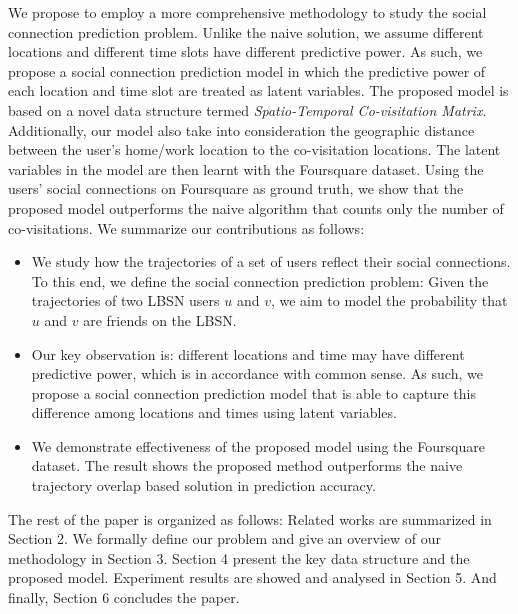 We propose to employ a more comprehensive methodology to study the social connection prediction problem. Unlike the naive solution, we assume different locations and different time slots have different predictive power. As such, we propose a social connection prediction model in which the predictive power of each location and time slot are treated as latent variables. The proposed model is based on a novel data structure termed \textit{Spatio-Temporal Co-visitation Matrix}. Additionally, our model also take into consideration the geographic distance between the user's home/work location to the co-visitation locations. The latent variables in the model are then learnt with the Foursquare dataset. Using the users' social connections on Foursquare as ground truth, we show that the proposed model outperforms the naive algorithm that counts only the number of co-visitations. We summarize our contributions as follows:
\begin{itemize}

\item We study how the trajectories of a set of users reflect their social connections. To this end, we define the social connection prediction problem: Given the trajectories of two LBSN users $u$ and $v$, we aim to model the probability that $u$ and $v$ are friends on the LBSN.

\item Our key observation is: different locations and time may have different predictive power, which is in accordance with common sense. As such, we propose a social connection prediction model that is able to capture this difference among locations and times using latent variables.

\item We demonstrate effectiveness of the proposed model using the Foursquare dataset. The result shows the proposed method outperforms the naive trajectory overlap based solution in prediction accuracy.

\end{itemize} 

The rest of the paper is organized as follows: Related works are summarized in Section 2. We formally define our problem and give an overview of our methodology in Section 3. Section 4 present the key data structure and the proposed model. Experiment results are showed and analysed in Section 5. And finally, Section 6 concludes the paper.
